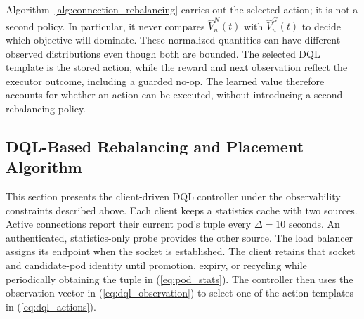\documentclass[manuscript,nonacm]{acmart}
\begin{document}
Algorithm~\ref{alg:connection_rebalancing} carries out the selected action;
it is not a second policy. In particular, it never compares
$\widehat{V}^N_u(t)$ with $\widehat{V}^G_u(t)$ to decide which objective will
dominate. These normalized quantities can have different observed
distributions even though both are bounded. The selected DQL template is the
stored action, while the reward and next observation reflect the executor
outcome, including a guarded no-op. The learned value therefore accounts for whether an action can be executed,
without introducing a second rebalancing policy.


\subsection{DQL-Based Rebalancing and Placement Algorithm}
This section presents the client-driven DQL controller under the observability
constraints described above. Each client keeps a statistics cache with two sources.
Active connections report their current pod's tuple every $\Delta=10$ seconds.
An authenticated, statistics-only probe provides the other source. The load
balancer assigns its endpoint when the socket is established. The
client retains that socket and candidate-pod identity until promotion, expiry,
or recycling while periodically obtaining the tuple in (\ref{eq:pod_stats}). The controller then
uses the observation vector in (\ref{eq:dql_observation}) to select one of the
action templates in (\ref{eq:dql_actions}).
\end{document}
